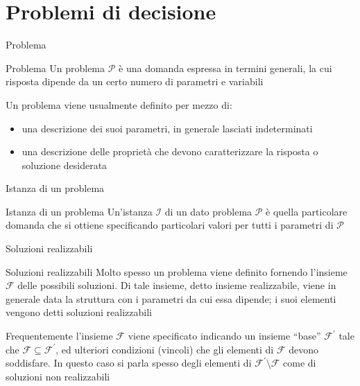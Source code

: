 \documentclass{beamer}
\begin{document}
\generatitolo

\section{Problemi di decisione}

\begin{frame}{Problema}
\begin{block}{Problema}
Un problema $\mathcal{P}$ \`e una domanda espressa in termini generali, la cui risposta
dipende da un certo numero di parametri e variabili
\end{block}
Un problema viene usualmente definito per mezzo di:
\begin{itemize}
\item una descrizione dei suoi parametri, in generale lasciati indeterminati
\item una descrizione delle propriet\`a che devono caratterizzare la risposta
o soluzione desiderata
\end{itemize} 
\end{frame}

\begin{frame}{Istanza di un problema}
\begin{block}{Istanza di un problema}
Un'istanza $\mathcal{I}$ di un dato problema $\mathcal{P}$ \`e quella particolare domanda
che si ottiene specificando particolari valori per tutti i parametri di $\mathcal{P}$
\end{block}
\end{frame}

\begin{frame}{Soluzioni realizzabili}

\begin{block}{Soluzioni realizzabili}
Molto spesso un problema viene definito fornendo l'insieme $\mathcal{F}$
delle possibili soluzioni. Di tale insieme, detto insieme realizzabile,
viene in generale data la struttura con i parametri da cui essa dipende;
i suoi elementi vengono detti \alert{soluzioni realizzabili}
\end{block}

Frequentemente l'insieme $\mathcal{F}$ viene specificato indicando un insieme
``base'' $\mathcal{F}^\prime$ tale che $\mathcal{F}\subseteq \mathcal{F}^\prime$, ed ulteriori condizioni
(vincoli) che gli elementi di $\mathcal{F}$ devono soddisfare. In questo
caso si parla spesso degli elementi di $\mathcal{F}^\prime\setminus \mathcal{F}$ come di \alert{soluzioni
non realizzabili}
\end{frame}
\end{document}
